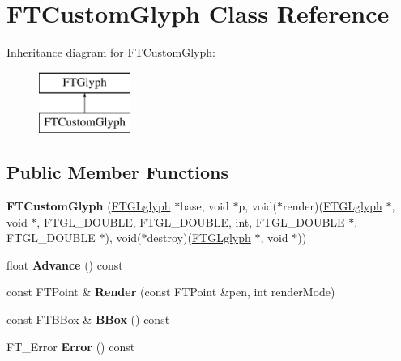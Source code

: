 \hypertarget{class_f_t_custom_glyph}{}\section{F\+T\+Custom\+Glyph Class Reference}
\label{class_f_t_custom_glyph}
Inheritance diagram for F\+T\+Custom\+Glyph\+:\begin{figure}[H]
\begin{center}
\leavevmode
\includegraphics[height=2.000000cm]{class_f_t_custom_glyph}
\end{center}
\end{figure}
\subsection*{Public Member Functions}
\begin{DoxyCompactItemize}
\item 
{\bfseries F\+T\+Custom\+Glyph} (\hyperlink{struct___f_t_g_lglyph}{F\+T\+G\+Lglyph} $\ast$base, void $\ast$p, void($\ast$render)(\hyperlink{struct___f_t_g_lglyph}{F\+T\+G\+Lglyph} $\ast$, void $\ast$, F\+T\+G\+L\+\_\+\+D\+O\+U\+B\+LE, F\+T\+G\+L\+\_\+\+D\+O\+U\+B\+LE,                                                                                                                               int, F\+T\+G\+L\+\_\+\+D\+O\+U\+B\+LE $\ast$, F\+T\+G\+L\+\_\+\+D\+O\+U\+B\+LE $\ast$), void($\ast$destroy)(\hyperlink{struct___f_t_g_lglyph}{F\+T\+G\+Lglyph} $\ast$, void $\ast$))\hypertarget{class_f_t_custom_glyph_abd191f1542bfd6d483bdf9dfd22957ec}{}\label{class_f_t_custom_glyph_abd191f1542bfd6d483bdf9dfd22957ec}

\item 
float {\bfseries Advance} () const \hypertarget{class_f_t_custom_glyph_aa8f17e3a9547eafed913e2b8f9b70958}{}\label{class_f_t_custom_glyph_aa8f17e3a9547eafed913e2b8f9b70958}

\item 
const F\+T\+Point \& {\bfseries Render} (const F\+T\+Point \&pen, int render\+Mode)\hypertarget{class_f_t_custom_glyph_a29285cf4a9b5476a80b01e1678272bd6}{}\label{class_f_t_custom_glyph_a29285cf4a9b5476a80b01e1678272bd6}

\item 
const F\+T\+B\+Box \& {\bfseries B\+Box} () const \hypertarget{class_f_t_custom_glyph_aebed1d1515a24d6410f4c3f44686b75c}{}\label{class_f_t_custom_glyph_aebed1d1515a24d6410f4c3f44686b75c}

\item 
F\+T\+\_\+\+Error {\bfseries Error} () const \hypertarget{class_f_t_custom_glyph_a8a74b76186fb02da48849c3c094fb72e}{}\label{class_f_t_custom_glyph_a8a74b76186fb02da48849c3c094fb72e}

\end{DoxyCompactItemize}
